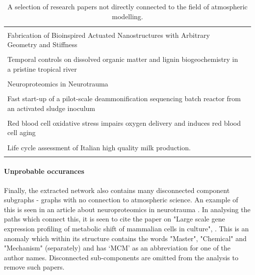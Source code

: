 \begin{table}[H]
\begin{center}
\begin{tabular}{ p{}|l }
 \hline
   & \\
 Fabrication of Bioinspired Actuated Nanostructures with Arbitrary Geometry and Stiffness & \citep{nano} \\ \\
 Temporal controls on dissolved organic matter and lignin biogeochemistry in a pristine tropical river  & \citep{biogeo} \\ \\
Neuroproteomics in Neurotrauma & \citep{neurotrauma}\\ \\
%
Fast start-up of a pilot-scale deammonification sequencing batch reactor from an activated sludge inoculum & \citep{pilot} \\ \\
Red blood cell oxidative stress impairs oxygen  delivery and induces red blood cell aging & \citep{blood} \\ \\
%
Life cycle assessment of Italian high quality milk production. & \citep{milk}\\ \\
%
 \hline
\end{tabular}
\end{center}

\caption{A selection of research papers not directly connected to the field of atmospheric modelling.}
\label{table:otherpapers}
\end{table}



\paragraph*{Unprobable occurances}
Finally, the extracted network also contains many disconnected component subgraphs - graphs with no connection to atmospheric science. An example of this is seen in an article about neuroproteomics in neurotrauma \citep{neurotrauma}. In analysing the paths which connect this, it is seen to cite the paper on "Large scale gene expression profiling of metabolic shift of mammalian cells in culture", \citep{neuro2}. This is an anomaly which within its structure contains the words "Master", "Chemical" and "Mechanism" (separately) and has `MCM' as an abbreviation for one of the author names. Disconnected sub-components are omitted from the analysis to remove such papers.





